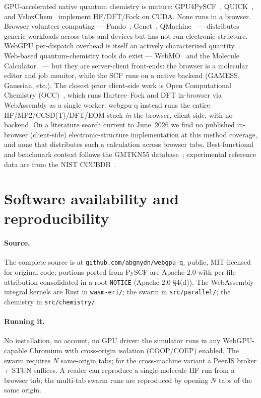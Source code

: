 \documentclass[11pt]{article}
\begin{document}
GPU-accelerated native quantum chemistry is mature: GPU4PySCF~\cite{gpu4pyscf},
QUICK~\cite{quick}, and VeloxChem~\cite{veloxchem} implement HF/DFT/Fock on
CUDA. None runs in a browser. Browser volunteer computing ---
Pando~\cite{pando}, Genet~\cite{genet}, QMachine~\cite{qmachine} ---
distributes generic workloads across tabs and devices but has not run
electronic structure. WebGPU per-dispatch overhead is itself an actively
characterized quantity~\cite{webgpudispatch}. Web-based quantum-chemistry tools
do exist ---
WebMO~\cite{webmo} and the Molecule Calculator~\cite{molcalc} --- but they are
server-client front-ends: the browser is a molecular editor and job monitor,
while the SCF runs on a native backend (GAMESS, Gaussian, etc.). The closest
prior client-side work is Open Computational Chemistry (OCC)~\cite{occ}, which
runs Hartree--Fock and DFT in-browser via WebAssembly as a single worker.
webgpu-q instead runs the entire HF/MP2/CCSD(T)/DFT/EOM stack \emph{in} the
browser, client-side, with no backend. On a literature search current to
June~2026 we find no published in-browser (client-side) electronic-structure
implementation
at this method coverage, and none that distributes such a calculation across
browser tabs. Best-functional and benchmark context follows the GMTKN55
database~\cite{gmtkn55}; experimental reference data are from the NIST
CCCBDB~\cite{cccbdb}.

\section{Software availability and reproducibility}

\paragraph{Source.} The complete source is at
\texttt{github.com/abgnydn/webgpu-q}, public, MIT-licensed for original code;
portions ported from PySCF are Apache-2.0 with per-file attribution
consolidated in a root \texttt{NOTICE} (Apache-2.0 \S4(d)). The WebAssembly
integral kernels are Rust in \texttt{wasm-eri/}; the swarm in
\texttt{src/parallel/}; the chemistry in \texttt{src/chemistry/}.

\paragraph{Running it.} No installation, no account, no GPU driver: the
simulator runs in any WebGPU-capable Chromium with cross-origin isolation
(COOP/COEP) enabled. The swarm requires $N$ same-origin tabs; for the
cross-machine variant a PeerJS broker + STUN suffices. A reader can reproduce a
single-molecule HF run from a browser tab; the multi-tab swarm runs are
reproduced by opening $N$ tabs of the same origin.
\end{document}
